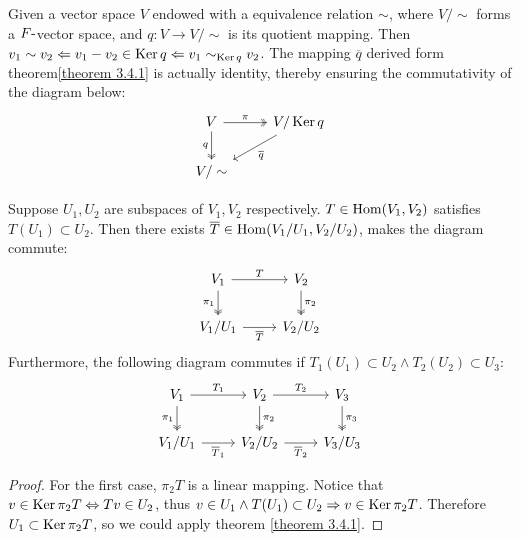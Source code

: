 \begin{theorem}
    Given a vector space $V$ endowed with a equivalence relation $\sim$, where $V / \sim$ forms a $F \mbox{-}$vector space, and $q: V \to V/\sim$ is its quotient mapping. Then $v_1 \sim v_2 \Leftarrow v_1 - v_2 \in \operatorname{Ker} q \Leftarrow v_1 \sim_{\operatorname{Ker} q} v_2$. The mapping $\overline{q}$ derived form theorem\ref{theorem 3.4.1} is actually identity, thereby ensuring the commutativity of the diagram below:
    \[
        \begin{tikzcd}
            V \arrow[two heads, r, "\pi"] \arrow[two heads, d, "q"'] 
            & V / \Ker q \arrow[ld, "\overline{q}"] 
            \\
            V / \sim
        \end{tikzcd}
    \]
\end{theorem}










\begin{theorem}
    Suppose $U_1, U_2$ are subspaces of $V_1, V_2$ respectively. $T \in \operatorname{Hom}(V_1, V_2)$ satisfies $T(U_1) \subset U_2$. Then there exists $\overline{T} \in \operatorname{Hom}(V_1 / U_1, V_2 / U_2)$, makes the diagram commute:
    \[
        \begin{tikzcd}
            V_1 \arrow[r, "T"] \arrow[two heads, d, "\pi_1"']
            & V_2 \arrow[two heads, d, "\pi_2"]
            \\
            V_1 / U_1 \arrow[r, "\overline{T}"']
            & V_2 / U_2
        \end{tikzcd}
    \]
    Furthermore, the following diagram commutes if $T_1(U_1) \subset U_2 \land T_2(U_2) \subset U_3$:
    \[
        \begin{tikzcd}
            V_1 \arrow[r, "T_1"] \arrow[two heads, d, "\pi_1"']
            & V_2 \arrow[r, "T_2"] \arrow[two heads, d, "\pi_2"]
            & V_3 \arrow[two heads, d, "\pi_3"]
            \\
            V_1 / U_1 \arrow[r, "\overline{T}_1"']
            & V_2 / U_2 \arrow[r, "\overline{T}_2"']
            & V_3 / U_3
        \end{tikzcd}
    \]
\end{theorem}

\begin{proof}
    For the first case, $\pi_2 T$ is a linear mapping. Notice that $v \in \operatorname{Ker} \pi_2 T \Leftrightarrow Tv \in U_2$, thus $v \in U_1 \land T(U_1) \subset U_2 \Rightarrow v \in \operatorname{Ker} \pi_2 T$. Therefore $U_1 \subset \operatorname{Ker} \pi_2 T$, so we could apply theorem \ref{theorem 3.4.1}.
\end{proof}








